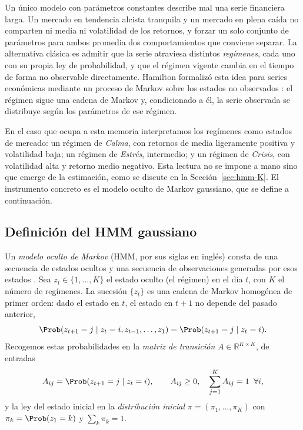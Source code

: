 Un único modelo con parámetros constantes describe mal una serie financiera larga. Un mercado en tendencia alcista tranquila y un mercado en plena caída no comparten ni media ni volatilidad de los retornos, y forzar un solo conjunto de parámetros para ambos promedia dos comportamientos que conviene separar. La alternativa clásica es admitir que la serie atraviesa distintos \emph{regímenes}, cada uno con su propia ley de probabilidad, y que el régimen vigente cambia en el tiempo de forma no observable directamente. Hamilton formalizó esta idea para series económicas mediante un proceso de Markov sobre los estados no observados \cite{hamilton1989}: el régimen sigue una cadena de Markov y, condicionado a él, la serie observada se distribuye según los parámetros de ese régimen.

En el caso que ocupa a esta memoria interpretamos los regímenes como estados de mercado: un régimen de \emph{Calma}, con retornos de media ligeramente positiva y volatilidad baja; un régimen de \emph{Estrés}, intermedio; y un régimen de \emph{Crisis}, con volatilidad alta y retorno medio negativo. Esta lectura no se impone a mano sino que emerge de la estimación, como se discute en la Sección~\ref{sec:hmm-K}. El instrumento concreto es el modelo oculto de Markov gaussiano, que se define a continuación.

\subsection{Definición del HMM gaussiano}
\label{sec:hmm-def}

Un \emph{modelo oculto de Markov} (HMM, por sus siglas en inglés) consta de una secuencia de estados ocultos y una secuencia de observaciones generadas por esos estados \cite{rabiner1989}. Sea $z_t \in \{1, \dots, K\}$ el estado oculto (el régimen) en el día $t$, con $K$ el número de regímenes. La sucesión $\{z_t\}$ es una cadena de Markov homogénea de primer orden: dado el estado en $t$, el estado en $t+1$ no depende del pasado anterior,
\[
\Prob(z_{t+1} = j \mid z_t = i, z_{t-1}, \dots, z_1) = \Prob(z_{t+1} = j \mid z_t = i).
\]
Recogemos estas probabilidades en la \emph{matriz de transición} $A \in \mathbb{R}^{K \times K}$, de entradas
\[
A_{ij} = \Prob(z_{t+1} = j \mid z_t = i), \qquad A_{ij} \ge 0, \quad \sum_{j=1}^{K} A_{ij} = 1 \;\;\forall i,
\]
y la ley del estado inicial en la \emph{distribución inicial} $\pi = (\pi_1, \dots, \pi_K)$ con $\pi_k = \Prob(z_1 = k)$ y $\sum_k \pi_k = 1$.


